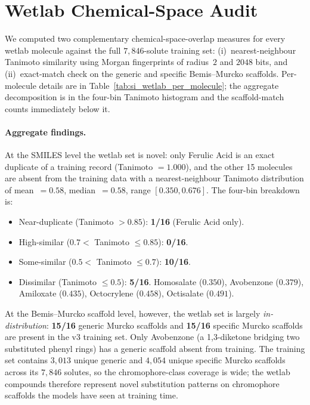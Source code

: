 \documentclass[journal=jcisd8,manuscript=suppinfo]{achemso}
\begin{document}
\section{Wetlab Chemical-Space Audit}
\label{si:wetlab_audit}

We computed two complementary chemical-space-overlap measures for every wetlab molecule against the full $7{,}846$-solute training set: (i)~nearest-neighbour Tanimoto similarity using Morgan fingerprints of radius~$2$ and $2048$ bits, and (ii)~exact-match check on the generic and specific Bemis--Murcko scaffolds. Per-molecule details are in Table~\ref{tab:si_wetlab_per_molecule}; the aggregate decomposition is in the four-bin Tanimoto histogram and the scaffold-match counts immediately below it.

\paragraph{Aggregate findings.}
At the SMILES level the wetlab set is novel: only Ferulic Acid is an exact duplicate of a training record (Tanimoto $= 1.000$), and the other 15 molecules are absent from the training data with a nearest-neighbour Tanimoto distribution of mean~$= 0.58$, median~$= 0.58$, range $[0.350, 0.676]$. The four-bin breakdown is:
\begin{itemize}[leftmargin=2em,itemsep=2pt]
 \item Near-duplicate (Tanimoto $> 0.85$): \textbf{1/16} (Ferulic Acid only).
 \item High-similar ($0.7 < $ Tanimoto $\leq 0.85$): \textbf{0/16}.
 \item Some-similar ($0.5 < $ Tanimoto $\leq 0.7$): \textbf{10/16}.
 \item Dissimilar (Tanimoto $\leq 0.5$): \textbf{5/16}. Homosalate ($0.350$), Avobenzone ($0.379$), Amiloxate ($0.435$), Octocrylene ($0.458$), Octisalate ($0.491$).
\end{itemize}

\noindent
At the Bemis--Murcko scaffold level, however, the wetlab set is largely \emph{in-distribution}: \textbf{15/16} generic Murcko scaffolds and \textbf{15/16} specific Murcko scaffolds are present in the v3 training set. Only Avobenzone (a 1,3-diketone bridging two substituted phenyl rings) has a generic scaffold absent from training. The training set contains $3{,}013$ unique generic and $4{,}054$ unique specific Murcko scaffolds across its $7{,}846$ solutes, so the chromophore-class coverage is wide; the wetlab compounds therefore represent novel substitution patterns on chromophore scaffolds the models have seen at training time.
\end{document}
